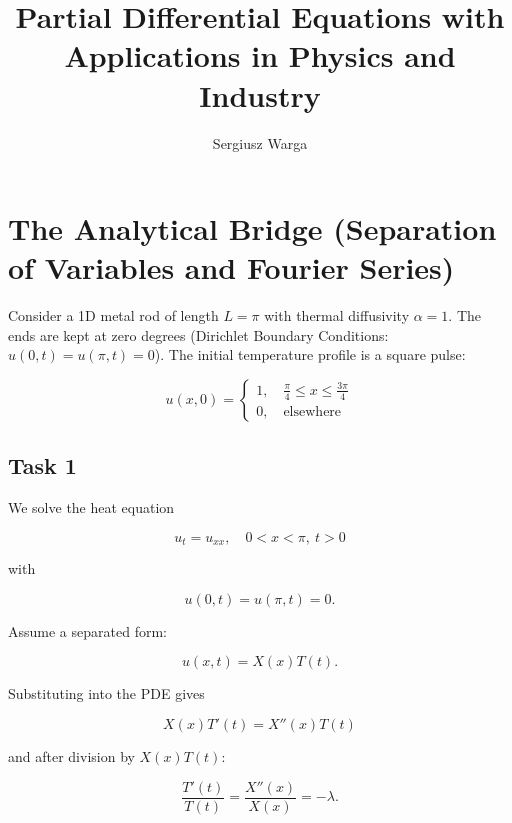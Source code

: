 \documentclass[a4paper]{article}
\author{Sergiusz Warga}
\title{Partial Differential Equations with Applications in Physics and Industry}
\begin{document}
\maketitle

\section{The Analytical Bridge (Separation of Variables and Fourier Series)}

Consider a 1D metal rod of length $L = \pi$ with thermal diffusivity $\alpha = 1$.
The ends are kept at zero degrees (Dirichlet Boundary Conditions: $u(0,t) = u(\pi,t) = 0$).
The initial temperature profile is a square pulse:

\begin{equation}
  u(x,0) = 
    \begin{cases}
      1, \quad \frac{\pi}{4} \le x \le \frac{3\pi}{4} \\
      0, \quad \text{elsewhere}
    \end{cases}
\end{equation}

\subsection{Task 1}

We solve the heat equation

\begin{equation}
  u_t = u_{xx}, \quad 0 < x < \pi, \ t > 0
\end{equation}

with

\begin{equation}
  u(0,t) = u(\pi,t) = 0.
\end{equation}

Assume a separated form:

\begin{equation}
  u(x,t) = X(x)T(t).
\end{equation}

Substituting into the PDE gives

\begin{equation}
  X(x)T'(t) = X''(x)T(t)
\end{equation}

and after division by $X(x)T(t)$:

\begin{equation}
  \frac{T'(t)}{T(t)} = \frac{X''(x)}{X(x)} = -\lambda.
\end{equation}
\end{document}
